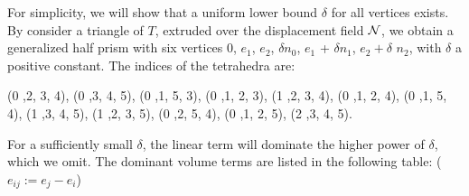 For simplicity, we will show that a uniform lower bound $\delta$ for all vertices exists. By consider a triangle of $T$, extruded over the displacement field $\mathcal{N}$, we obtain a generalized half prism with six vertices
$0$, $e_1$, $e_2$, $\delta n_0$, $e_1$ + $\delta n_1$, $e_2 + \delta$ $n_2$, with $\delta$ a positive constant. The indices of the tetrahedra are:

(0 ,2, 3, 4), 
(0 ,3, 4, 5), 
(0 ,1, 5, 3), 
(0 ,1, 2, 3), 
(1 ,2, 3, 4), 
(0 ,1, 2, 4), 
(0 ,1, 5, 4), 
(1 ,3, 4, 5), 
(1 ,2, 3, 5), 
(0 ,2, 5, 4), 
(0 ,1, 2, 5), 
(2 ,3, 4, 5). 

For a sufficiently small $\delta$, the linear term will dominate the higher power of $\delta$, which we omit. 
The dominant volume terms are listed in the following table: ($e_{ij} := e_j - e_i$)

